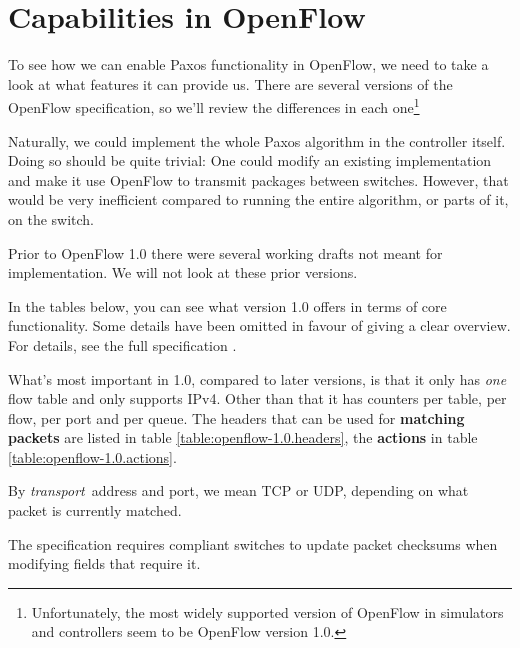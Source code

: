 \section{Capabilities in OpenFlow}
\label{chapter:details.openflow}


To see how we can enable Paxos functionality in OpenFlow, we need to take a
look at what features it can provide us.  There are several versions of the
OpenFlow specification, so we'll review the differences in each
one\footnote{Unfortunately, the most widely supported version of OpenFlow in
simulators and controllers seem to be OpenFlow version 1.0.}

Naturally, we could implement the whole Paxos algorithm in the controller
itself.  Doing so should be quite trivial: One could modify an existing
implementation and make it use OpenFlow to transmit packages between
switches.  However, that would be very inefficient compared to running the
entire algorithm, or parts of it, on the switch.

Prior to OpenFlow 1.0 \cite{openflow-1.0} there were several working
drafts not meant for implementation.  We will not look at these prior
versions.

In the tables below, you can see what version 1.0 offers in terms of core
functionality.  Some details have been omitted in favour of giving a clear
overview.  For details, see the full specification \cite{openflow-1.0}.

What's most important in 1.0, compared to later versions, is that it only
has {\em one} flow table and only supports IPv4.  Other than that it has
counters per table, per flow, per port and per queue.  The headers that can
be used for \textbf{matching packets} are listed in table
\ref{table:openflow-1.0.headers}, the \textbf{actions} in table
\ref{table:openflow-1.0.actions}.

By \textit{transport} address and port, we mean \acs{TCP} or \acs{UDP},
depending on what packet is currently matched.

The specification requires compliant switches to update packet checksums
when modifying fields that require it.


